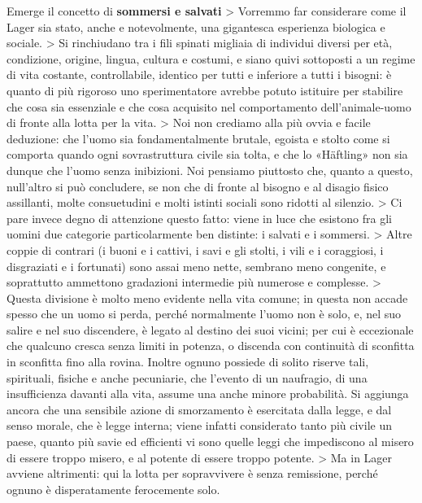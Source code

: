 Emerge il concetto di \textbf{sommersi e salvati}
> Vorremmo far considerare come il Lager sia stato, anche e notevolmente, una gigantesca esperienza biologica e sociale.
> Si rinchiudano tra i fili spinati migliaia di individui diversi per età, condizione, origine, lingua, cultura e costumi, e siano quivi sottoposti a un regime di vita costante, controllabile, identico per tutti e inferiore a tutti i bisogni: è quanto di più rigoroso uno sperimentatore avrebbe potuto istituire per stabilire che cosa sia essenziale e che cosa acquisito nel comportamento dell'animale-uomo di fronte alla lotta per la vita.
> Noi non crediamo alla più ovvia e facile deduzione: che l'uomo sia fondamentalmente brutale, egoista e stolto come si comporta quando ogni sovrastruttura civile sia tolta, e che lo «Häftling» non sia dunque che l'uomo senza inibizioni. Noi pensiamo piuttosto che, quanto a questo, null'altro si può concludere, se non che di fronte al bisogno e al disagio fisico assillanti, molte consuetudini e molti istinti sociali sono ridotti al silenzio.
> Ci pare invece degno di attenzione questo fatto: viene in luce che esistono fra gli uomini due categorie particolarmente ben distinte: i salvati e i sommersi.
> Altre coppie di contrari (i buoni e i cattivi, i savi e gli stolti, i vili e i coraggiosi, i disgraziati e i fortunati) sono assai meno nette, sembrano meno congenite, e soprattutto ammettono gradazioni intermedie più numerose e complesse.
> Questa divisione è molto meno evidente nella vita comune; in questa non accade spesso che un uomo si perda, perché normalmente l'uomo non è solo, e, nel suo salire e nel suo discendere, è legato al destino dei suoi vicini; per cui è eccezionale che qualcuno cresca senza limiti in potenza, o discenda con continuità di sconfitta in sconfitta fino alla rovina. Inoltre ognuno possiede di solito riserve tali, spirituali, fisiche e anche pecuniarie, che l'evento di un naufragio, di una insufficienza davanti alla vita, assume una anche minore probabilità. Si aggiunga ancora che una sensibile azione di smorzamento è esercitata dalla legge, e dal senso morale, che è legge interna; viene infatti considerato tanto più civile un paese, quanto più savie ed efficienti vi sono quelle leggi che impediscono al misero di essere troppo misero, e al potente di essere troppo potente.
> Ma in Lager avviene altrimenti: qui la lotta per sopravvivere è senza remissione, perché ognuno è disperatamente ferocemente solo.

